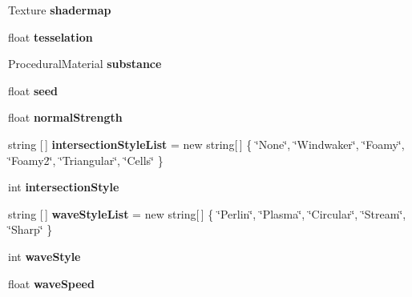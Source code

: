 \begin{DoxyCompactItemize}
Texture {\bfseries shadermap}
\item 
\mbox{\label{class_stylized_water_a1dcb2063bf988f6521414b7c21a64740}} 
float {\bfseries tesselation}
\item 
\mbox{\label{class_stylized_water_a709389aa4765c4744ad10074f701301b}} 
Procedural\+Material {\bfseries substance}
\item 
\mbox{\label{class_stylized_water_a9c8df1d871e579f4102f9edc6eecf89c}} 
float {\bfseries seed}
\item 
\mbox{\label{class_stylized_water_a8898e7a03e081d03a50331f4a05ff486}} 
float {\bfseries normal\+Strength}
\item 
\mbox{\label{class_stylized_water_ab6666acae4a5754aa8c16ab33589733d}} 
string \mbox{[}$\,$\mbox{]} {\bfseries intersection\+Style\+List} = new string\mbox{[}$\,$\mbox{]} \{ \char`\"{}None\char`\"{}, \char`\"{}Windwaker\char`\"{}, \char`\"{}Foamy\char`\"{}, \char`\"{}Foamy2\char`\"{}, \char`\"{}Triangular\char`\"{}, \char`\"{}Cells\char`\"{} \}
\item 
\mbox{\label{class_stylized_water_a39c1e2a2161a52ee51a49e36a83288eb}} 
int {\bfseries intersection\+Style}
\item 
\mbox{\label{class_stylized_water_ab470173a6fd22aed845d54a0847278c7}} 
string \mbox{[}$\,$\mbox{]} {\bfseries wave\+Style\+List} = new string\mbox{[}$\,$\mbox{]} \{ \char`\"{}Perlin\char`\"{}, \char`\"{}Plasma\char`\"{}, \char`\"{}Circular\char`\"{}, \char`\"{}Stream\char`\"{}, \char`\"{}Sharp\char`\"{} \}
\item 
\mbox{\label{class_stylized_water_ac97668e64e77e5a90a956953f8dbfa14}} 
int {\bfseries wave\+Style}
\item 
\mbox{\label{class_stylized_water_acd0468c5fdc8c63b2cf0d98862d40e89}} 
float {\bfseries wave\+Speed}
\item 
\mbox{\label{class_stylized_water_a0bf36a820254999d6034ee411ee850f1}} 

\end{DoxyCompactItemize}
